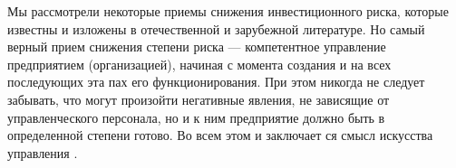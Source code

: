 Мы рассмотрели некоторые приемы снижения инвестиционного риска, которые известны и изложены в отечественной и зарубежной литературе.
Но самый верный прием снижения степени риска --- компетентное управление предприятием (организацией), начиная с момента создания и на всех последующих эта пах его функционирования.
При этом никогда не следует забывать, что могут произойти негативные явления, не зависящие от управленческого персонала, но и к ним предприятие должно быть в определенной степени готово.
Во всем этом и заключает ся смысл искусства управления \cite[243--244]{sergeev}.